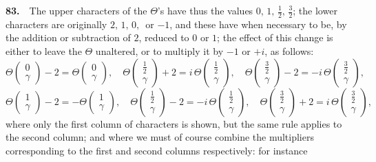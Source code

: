 \documentclass[11pt]{article}
\begin{document}
\textbf{83.}\ \ The upper characters of the $\Theta$'s have thus the values $0,\,1,\,\tfrac{1}{2},\,\tfrac{3}{2}$; the lower characters are originally $2,\,1,\,0,\,$ or $-1$, and these have when necessary to be, by the addition or subtraction of $2$, reduced to $0$ or $1$; the effect of this change is either to leave the $\Theta$ unaltered, or to multiply it by $-1$ or $+i$, as follows:
\[
\Theta\!\begin{pmatrix}0\\ \gamma\end{pmatrix} - 2 = \Theta\!\begin{pmatrix}0\\ \gamma\end{pmatrix},\quad
\Theta\!\begin{pmatrix}\tfrac{1}{2}\\ \gamma\end{pmatrix} + 2 = i\,\Theta\!\begin{pmatrix}\tfrac{1}{2}\\ \gamma\end{pmatrix},\quad
\Theta\!\begin{pmatrix}\tfrac{3}{2}\\ \gamma\end{pmatrix} - 2 = -i\,\Theta\!\begin{pmatrix}\tfrac{3}{2}\\ \gamma\end{pmatrix},
\]
\[
\Theta\!\begin{pmatrix}1\\ \gamma\end{pmatrix} - 2 = -\Theta\!\begin{pmatrix}1\\ \gamma\end{pmatrix},\quad
\Theta\!\begin{pmatrix}\tfrac{1}{2}\\ \gamma\end{pmatrix} - 2 = -i\,\Theta\!\begin{pmatrix}\tfrac{1}{2}\\ \gamma\end{pmatrix},\quad
\Theta\!\begin{pmatrix}\tfrac{3}{2}\\ \gamma\end{pmatrix} + 2 = i\,\Theta\!\begin{pmatrix}\tfrac{3}{2}\\ \gamma\end{pmatrix},
\]
where only the first column of characters is shown, but the same rule applies to the second column; and where we must of course combine the multipliers corresponding to the first and second columns respectively: for instance
\end{document}
